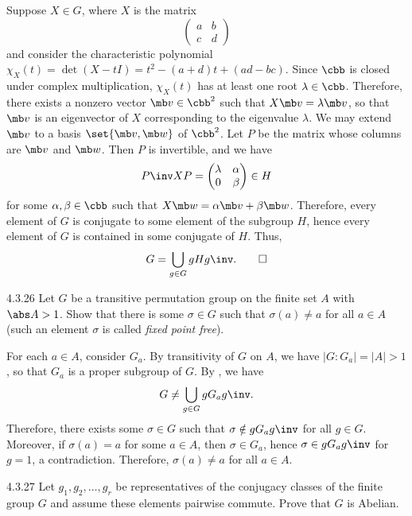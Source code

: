 \begin{sol}
	Suppose $X \in G$, where $X$ is the matrix
	\[
		\begin{pmatrix}
			a & b \\
			c & d
		\end{pmatrix}
	\]
	and consider the characteristic polynomial $\chi_X(t) = \det(X - tI) = t^2 - (a + d)t + (ad - bc)$.
	Since $\cbb$ is closed under complex multiplication, $\chi_X(t)$ has at least one root $\lambda \in \cbb$.
	Therefore, there exists a nonzero vector $\mb v \in \cbb^2$ such that $X\mb v = \lambda \mb v$, so that $\mb v$ is an eigenvector of $X$ corresponding to the eigenvalue $\lambda$.
	We may extend $\mb v$ to a basis $\set{\mb v, \mb w}$ of $\cbb^2$.
	Let $P$ be the matrix whose columns are $\mb v$ and $\mb w$.
	Then $P$ is invertible, and we have
	\[
		P\inv XP = \begin{pmatrix}
			\lambda & \alpha \\
			0 & \beta
		\end{pmatrix} \in H
	\]
	for some $\alpha, \beta \in \cbb$ such that $X\mb w = \alpha \mb v + \beta \mb w$.
	Therefore, every element of $G$ is conjugate to some element of the subgroup $H$, hence every element of $G$ is contained in some conjugate of $H$.
	Thus,
	\[
		G = \bigcup_{g \in G} gHg\inv. \qedhere
	\]
\end{sol}

\begin{exercise}{4.3.26}
	Let $G$ be a transitive permutation group on the finite set $A$ with $\abs A > 1$.
	Show that there is some $\sigma \in G$ such that $\sigma(a) \neq a$ for all $a \in A$ (such an element $\sigma$ is called \emph{fixed point free}).
\end{exercise}

\begin{sol}
	For each $a \in A$, consider $G_a$.
	By transitivity of $G$ on $A$, we have $|G : G_a| = |A| > 1$, so that $G_a$ is a proper subgroup of $G$.
	By , we have
	\[
		G \neq \bigcup_{g \in G} gG_ag\inv.
	\]
	Therefore, there exists some $\sigma \in G$ such that $\sigma \notin gG_ag\inv$ for all $g \in G$.
	Moreover, if $\sigma(a) = a$ for some $a \in A$, then $\sigma \in G_a$, hence $\sigma \in gG_ag\inv$ for $g = 1$, a contradiction.
	Therefore, $\sigma(a) \neq a$ for all $a \in A$.
\end{sol}

\begin{exercise}{4.3.27}
	Let $g_1, g_2, \ldots, g_r$ be representatives of the conjugacy classes of the finite group $G$ and assume these elements pairwise commute.
	Prove that $G$ is Abelian.
\end{exercise}


